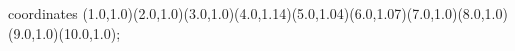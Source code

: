 					coordinates { (1.0,1.0)(2.0,1.0)(3.0,1.0)(4.0,1.14)(5.0,1.04)(6.0,1.07)(7.0,1.0)(8.0,1.0)(9.0,1.0)(10.0,1.0)};